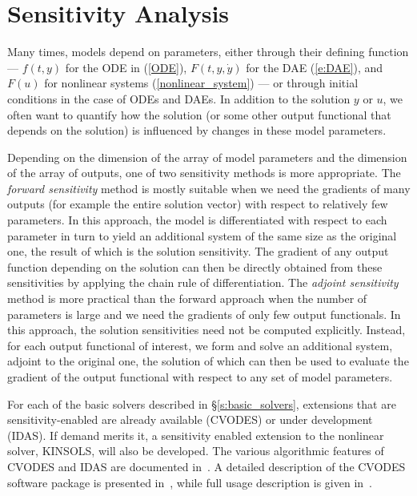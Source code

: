 \section{Sensitivity Analysis}\label{s:sensitivity_analysis}

Many times, models depend on parameters, either through their defining
function --- $f(t,y)$ for the ODE in (\ref{ODE}), $F(t,y,{\dot y})$ for the DAE
(\ref{e:DAE}), and $F(u)$ for nonlinear systems (\ref{nonlinear_system}) 
--- or through initial conditions in the case of ODEs and DAEs. 
In addition to the solution $y$ or $u$, we often want to quantify how 
the solution (or some other output functional that depends on the solution) 
is influenced by changes in these model parameters.

Depending on the dimension of the array of model parameters and the
dimension of the array of outputs, one of two sensitivity methods
is more appropriate. 
%
The {\em forward sensitivity} method is mostly suitable when we need 
the gradients of many outputs (for example the entire solution vector) 
with respect to relatively few parameters.
In this approach, the model is differentiated with respect to each 
parameter in turn to yield an additional system of the same size as
the original one, the result of which is the solution sensitivity.
The gradient of any output function depending on the solution can
then be directly obtained from these sensitivities by applying the
chain rule of differentiation.
%
The {\em adjoint sensitivity} method is more practical than
the forward approach when the number of parameters is large and
we need the gradients of only few output functionals.
In this approach, the solution sensitivities need not be computed
explicitly. Instead, for each output functional of interest, we form
and solve an additional system, adjoint to the original one, the 
solution of which can then be used to evaluate the gradient of the
output functional with respect to any set of model parameters.

For each of the basic solvers described in \S\ref{s:basic_solvers},
extensions that are sensitivity-enabled are already available (CVODES)
or under development (IDAS). If demand merits it, a sensitivity
enabled extension to the nonlinear solver, KINSOLS, will also be
developed.
The various algorithmic features of CVODES and IDAS are documented 
in~\cite{CLPS:03}. A detailed description of the CVODES software package 
is presented in~\cite{SeHi:03}, while full usage description is given
in~\cite{HiSe:02}.
%

